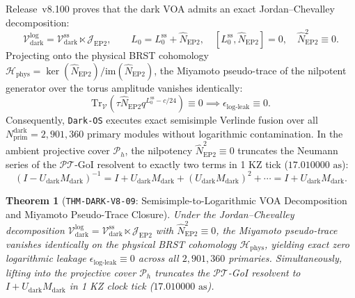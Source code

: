 \documentclass[11pt,onecolumn]{article}
\newtheorem{theorem}{Theorem}
\begin{document}
Release~v8.100 proves that the dark VOA admits an exact Jordan--Chevalley decomposition:
\begin{equation}
\mathcal{V}_{\text{dark}}^{\text{log}} = \mathcal{V}_{\text{dark}}^{\text{ss}} \ltimes \mathcal{J}_{\text{EP2}}, \qquad L_0 = L_0^{\text{ss}} + \hat{N}_{\text{EP2}}, \quad [L_0^{\text{ss}}, \hat{N}_{\text{EP2}}] = 0, \quad \hat{N}_{\text{EP2}}^2 \equiv 0.
\label{eq:v8_43}
\end{equation}
Projecting onto the physical BRST cohomology $\mathcal{H}_{\text{phys}} = \ker(\hat{N}_{\text{EP2}})/\text{im}(\hat{N}_{\text{EP2}})$, the Miyamoto pseudo-trace of the nilpotent generator over the torus amplitude vanishes identically:
\begin{equation}
\text{Tr}_{\mathcal{V}}(\tau \hat{N}_{\text{EP2}} q^{L_0^{\text{ss}} - c/24}) \equiv 0 \implies \epsilon_{\text{log-leak}} \equiv 0.
\label{eq:v8_44}
\end{equation}
Consequently, \texttt{Dark-OS} executes exact semisimple Verlinde fusion over all $N_{\text{prim}}^{\text{dark}} = 2{,}901{,}360$ primary modules without logarithmic contamination. In the ambient projective cover $\mathcal{P}_h$, the nilpotency $\hat{N}_{\text{EP2}}^2 \equiv 0$ truncates the Neumann series of the $\mathcal{PT}$-GoI resolvent to exactly two terms in 1 KZ tick ($17.010000\text{ as}$):
\begin{equation}
(I - U_{\text{dark}} M_{\text{dark}})^{-1} = I + U_{\text{dark}} M_{\text{dark}} + (U_{\text{dark}} M_{\text{dark}})^2 + \cdots = I + U_{\text{dark}} M_{\text{dark}}.
\label{eq:v8_45}
\end{equation}

\begin{theorem}[\texttt{THM-DARK-V8-09}: Semisimple-to-Logarithmic VOA Decomposition and Miyamoto Pseudo-Trace Closure]
\label{thm:dark_v8_09}
Under the Jordan--Chevalley decomposition $\mathcal{V}_{\text{dark}}^{\text{log}} = \mathcal{V}_{\text{dark}}^{\text{ss}} \ltimes \mathcal{J}_{\text{EP2}}$ with $\hat{N}_{\text{EP2}}^2 \equiv 0$, the Miyamoto pseudo-trace vanishes identically on the physical BRST cohomology $\mathcal{H}_{\text{phys}}$, yielding exact zero logarithmic leakage $\epsilon_{\text{log-leak}} \equiv 0$ across all $2{,}901{,}360$ primaries. Simultaneously, lifting into the projective cover $\mathcal{P}_h$ truncates the $\mathcal{PT}$-GoI resolvent to $I + U_{\text{dark}}M_{\text{dark}}$ in 1 KZ clock tick ($17.010000\text{ as}$).
\end{theorem}
\end{document}
